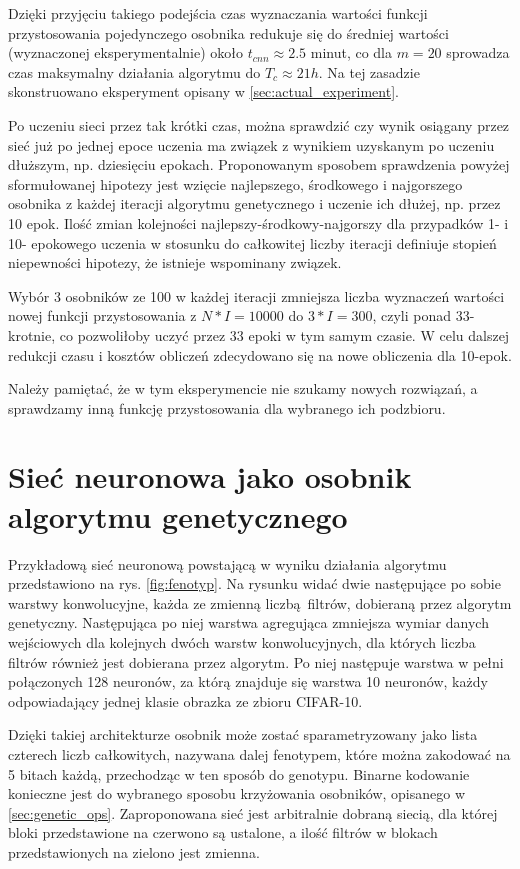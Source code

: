 Dzięki przyjęciu takiego podejścia czas wyznaczania wartości funkcji przystosowania pojedynczego osobnika redukuje się do średniej wartości (wyznaczonej eksperymentalnie) około $t_{cnn} \approx 2.5 $ minut, co dla $m = 20$ sprowadza czas maksymalny działania algorytmu do $T_c \approx 21 h$.
Na tej zasadzie skonstruowano eksperyment opisany w \ref{sec:actual_experiment}.

Po uczeniu sieci przez tak krótki czas, można sprawdzić czy wynik osiągany przez sieć już po jednej epoce uczenia ma związek z wynikiem uzyskanym po uczeniu dłuższym, np. dziesięciu epokach.
Proponowanym sposobem sprawdzenia powyżej sformułowanej hipotezy jest wzięcie najlepszego, środkowego i najgorszego osobnika z każdej iteracji algorytmu genetycznego i uczenie ich dłużej, np. przez 10 epok.
Ilość zmian kolejności najlepszy-środkowy-najgorszy dla przypadków 1- i 10- epokowego uczenia w stosunku do całkowitej liczby iteracji definiuje stopień niepewności hipotezy, że istnieje wspominany związek.

Wybór 3 osobników ze 100 w każdej iteracji zmniejsza liczba wyznaczeń wartości nowej funkcji przystosowania z $N*I = 10000$ do $3*I = 300$, czyli ponad 33-krotnie, co pozwoliłoby uczyć przez 33 epoki w tym samym czasie.
W celu dalszej redukcji czasu i kosztów obliczeń zdecydowano się na nowe obliczenia dla 10-epok.

Należy pamiętać, że w tym eksperymencie nie szukamy nowych rozwiązań, a sprawdzamy inną funkcję przystosowania dla wybranego ich podzbioru.

\section{Sieć neuronowa jako osobnik algorytmu genetycznego}\label{sec:fenotyp}

Przykładową sieć neuronową powstającą w wyniku działania algorytmu przedstawiono na rys. \ref{fig:fenotyp}.
Na rysunku widać dwie następujące po sobie warstwy konwolucyjne, każda ze zmienną liczbą filtrów, dobieraną przez algorytm genetyczny.
Następująca po niej warstwa agregująca zmniejsza wymiar danych wejściowych dla kolejnych dwóch warstw konwolucyjnych, dla których liczba filtrów również jest dobierana przez algorytm.
Po niej następuje warstwa w pełni połączonych 128 neuronów, za którą znajduje się warstwa 10 neuronów, każdy odpowiadający jednej klasie obrazka ze zbioru CIFAR-10.

Dzięki takiej architekturze osobnik może zostać sparametryzowany jako lista czterech liczb całkowitych, nazywana dalej fenotypem, które można zakodować na 5 bitach każdą, przechodząc w ten sposób do genotypu.
Binarne kodowanie konieczne jest do wybranego sposobu krzyżowania osobników, opisanego w \ref{sec:genetic_ops}.
Zaproponowana sieć jest arbitralnie dobraną siecią, dla której bloki przedstawione na czerwono są ustalone, a ilość filtrów w blokach przedstawionych na zielono jest zmienna.

